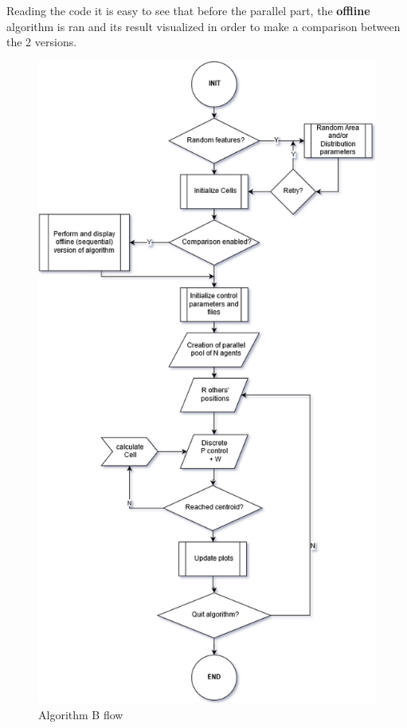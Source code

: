 \documentclass[a4paper,11pt,oneside]{book}
\begin{document}
	Reading the code it is easy to see that before the parallel part, the \textbf{offline} algorithm is ran and its result visualized in order to make a comparison between the 2 versions.
	
	
	
	
	
	
	
	
	
	
	
	
	
	\begin{figure}[hb]
		
		\centering
		
		\includegraphics[scale=0.55]{figs/algorithmB.png}
		
		\caption{Algorithm B flow}\label{fig:algorithmB.png}
		
	\end{figure}
	
\end{document}
